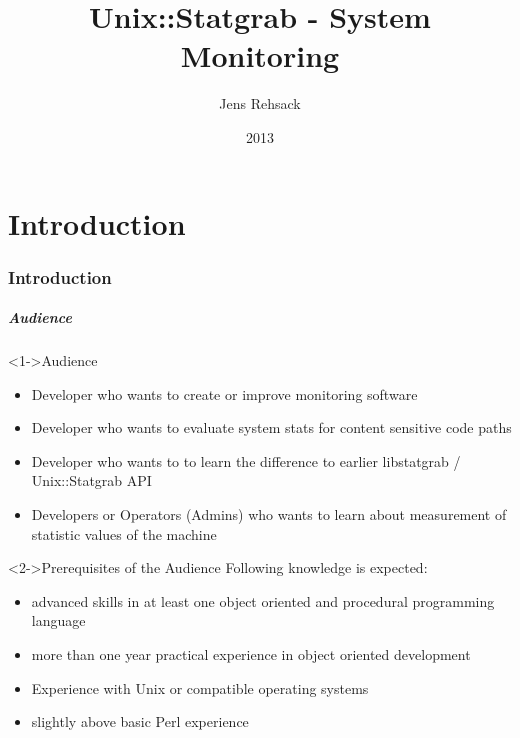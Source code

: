 \documentclass[ngerman,xcolor={table,dvipsnames},smaller,compress,hyperref={bookmarks,colorlinks}]{beamer}
\title{Unix::Statgrab - System Monitoring}
\author{Jens Rehsack}
\date{2013}
\begin{document}


\frame{\maketitle}

\part{Introduction}

\section{Introduction}

\begin{frame}[fragile]
\frametitle{Audience}
\begin{block}<1->{Audience}
\begin{itemize}
\item Developer who wants to create or improve monitoring software
\item Developer who wants to evaluate system stats for content sensitive
      code paths
\item Developer who wants to to learn the difference to earlier libstatgrab
      / Unix::Statgrab API
\item Developers or Operators (Admins) who wants to learn about measurement
      of statistic values of the machine
\end{itemize}
\end{block}

\begin{block}<2->{Prerequisites of the Audience}
Following knowledge is expected:
\begin{itemize}
\item advanced skills in at least one object oriented and procedural programming language
\item more than one year practical experience in object oriented development
\item Experience with Unix or compatible operating systems
\item slightly above basic Perl experience
\end{itemize}
\end{block}
\end{frame}
\end{document}
